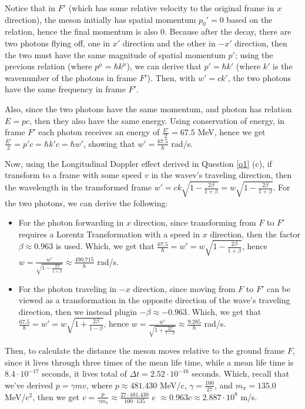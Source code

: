 \documentclass{article}
\begin{document}
Notice that in $F'$ (which has some relative velocity to the original frame in $x$ direction), the meson initially has spatial momentum $p_0' = 0$ based on the relation, hence the final momentum is also $0$. Because after the decay, there are two photons flying off, one in $x'$ direction and the other in $-x'$ direction, then the two must have the same magnitude of spatial momentum $p'$; using the previous relation (where $p^\mu = \hbar k^\mu$), we can derive that $p' = \hbar k'$ (where $k'$ is the wavenumber of the photons in frame $F'$). Then, with $w' = ck'$, the two photons have the same frequency in frame $F'$. 

Also, since the two photons have the same momentum, and photon has relation $E=pc$, then they also have the same energy. Using conservation of energy, in frame $F'$ each photon receives an energy of $\frac{E'}{2} = 67.5$ MeV, hence we get $\frac{E'}{2} = p'c = \hbar k'c = \hbar w'$, showing that $w'= \frac{67.5}{\hbar}$ rad/s.

Now, using the Longitudinal Doppler effect derived in Question \ref{q1} (c), if transform to a frame with some speed $v$ in the wavev's traveling direction, then the wavelength in the transformed frame $w' = ck\sqrt{1-\frac{2\beta}{1+\beta}} = w\sqrt{1-\frac{2\beta}{1+\beta}}$. For the two photons, we can derive the following:
\begin{itemize}
    \item For the photon forwarding in $x$ direction, since transforming from $F$ to $F'$ requires a Lorentz Transformation with a speed in $x$ direction, then the factor $\beta \approx 0.963$ is used. Which, we get that $ \frac{67.5}{\hbar} = w' = w\sqrt{1-\frac{2\beta}{1+\beta}}$, hence $w = \frac{w'}{\sqrt{1-\frac{2\beta}{1+\beta}}} \approx \frac{490.715}{\hbar}$ rad/s.
    \item For the photon traveling in $-x$ direction, since moving from $F$ to $F'$ can be viewed as a transformation in the opposite direction of the wave's traveling direction, then we instead plugin $-\beta \approx -0.963$. Which, we get that $\frac{67.5}{\hbar}=w' = w\sqrt{1+\frac{2\beta}{1-\beta}}$, hence $w=\frac{w'}{\sqrt{1+\frac{2\beta}{1-\beta}}}\approx \frac{9.285}{\hbar}$ rad/s.
\end{itemize}

\hfil

Then, to calculate the distance the meson moves relative to the ground frame $F$, since it lives through three times of the mean life time, while a mean life time is $8.4\cdot 10^{-17}$ seconds, it lives total of $\Delta t = 2.52 \cdot 10^{-16}$ seconds. Which, recall that we've derived $p = \gamma mv$, where $p \approx 481.430$ MeV/c, $\gamma = \frac{100}{27}$, and $m_\pi = 135.0$ MeV/c$^2$, then we get $v = \frac{p}{\gamma m_\pi}\approx \frac{27\cdot 481.430}{100\cdot 135}$ c $\approx 0.963 c \approx 2.887 \cdot 10^8$ m/s.
\end{document}
